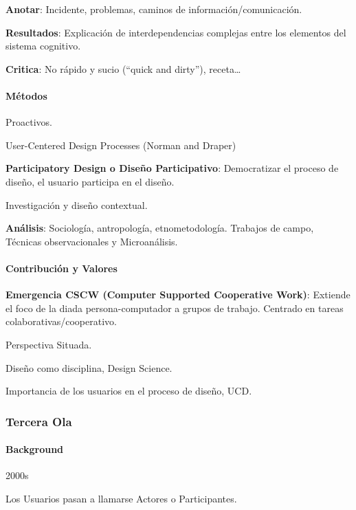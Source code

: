 \textbf{Anotar}: Incidente, problemas, caminos de
información/comunicación.

\textbf{Resultados}: Explicación de interdependencias complejas entre
los elementos del sistema cognitivo.

\textbf{Critica}: No rápido y sucio (``quick and dirty''),
receta\ldots{}

\hypertarget{muxe9todos-1}{%
\paragraph{Métodos}\label{muxe9todos-1}}

Proactivos.

User-Centered Design Processes (Norman and Draper)

\textbf{Participatory Design o Diseño Participativo}: Democratizar el
proceso de diseño, el usuario participa en el diseño.

Investigación y diseño contextual.

\textbf{Análisis}: Sociología, antropología, etnometodología. Trabajos
de campo, Técnicas observacionales y Microanálisis.

\hypertarget{contribuciuxf3n-y-valores-1}{%
\paragraph{Contribución y Valores}\label{contribuciuxf3n-y-valores-1}}

\textbf{Emergencia CSCW (Computer Supported Cooperative Work)}: Extiende
el foco de la diada persona-computador a grupos de trabajo. Centrado en
tareas colaborativas/cooperativo.

Perspectiva Situada.

Diseño como disciplina, Design Science.

Importancia de los usuarios en el proceso de diseño, UCD.

\hypertarget{tercera-ola}{%
\subsubsection{Tercera Ola}\label{tercera-ola}}

\hypertarget{background-2}{%
\paragraph{Background}\label{background-2}}

2000s

Los Usuarios pasan a llamarse Actores o Participantes.

